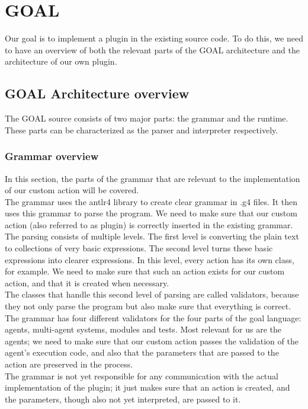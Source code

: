 \section{GOAL}
Our goal is to implement a plugin in the existing source code. To do this, we need to have an overview of both the relevant parts of the GOAL architecture and the architecture of our own plugin.

\subsection{GOAL Architecture overview}
The GOAL source consists of two major parts: the grammar and the runtime. These parts can be characterized as the parser and interpreter respectively.

\subsubsection{Grammar overview}
In this section, the parts of the grammar that are relevant to the implementation of our custom action will be covered. \\ 

The grammar uses the antlr4 library to create clear grammar in .g4 files. It then uses this grammar to parse the program. We need to make sure that our custom action (also referred to as plugin) is correctly inserted in the existing grammar. \\ 

The parsing consists of multiple levels. The first level is converting the plain text to collections of very basic expressions. The second level turns these basic expressions into clearer expressions. In this level, every action has its own class, for example. We need to make sure that such an action exists for our custom action, and that it is created when necessary. \\ 

The classes that handle this second level of parsing are called validators, because they not only parse the program but also make sure that everything is correct. The grammar has four different validators for the four parts of the goal language: agents, multi-agent systems, modules and tests. Most relevant for us are the agents; we need to make sure that our custom action passes the validation of the agent's execution code, and also that the parameters that are passed to the action are preserved in the process. \\ 

The grammar is not yet responsible for any communication with the actual implementation of the plugin; it just makes sure that an action is created, and the parameters, though also not yet interpreted, are passed to it.

